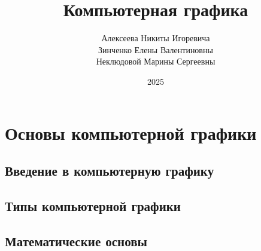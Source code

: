 \documentclass[referat]{SCWorks}
\begin{document}

\title{Компьютерная графика}






\author{Алексеева Никиты Игоревича \\ Зинченко Елены Валентиновны \\ Неклюдовой Марины Сергеевны}


\date{2025}

\maketitle

\secNumbering

\tableofcontents

\intro


\section{Основы компьютерной графики}
\subsection{Введение в компьютерную графику}

\subsection{Типы компьютерной графики}

\subsection{Математические основы}

\end{document}
